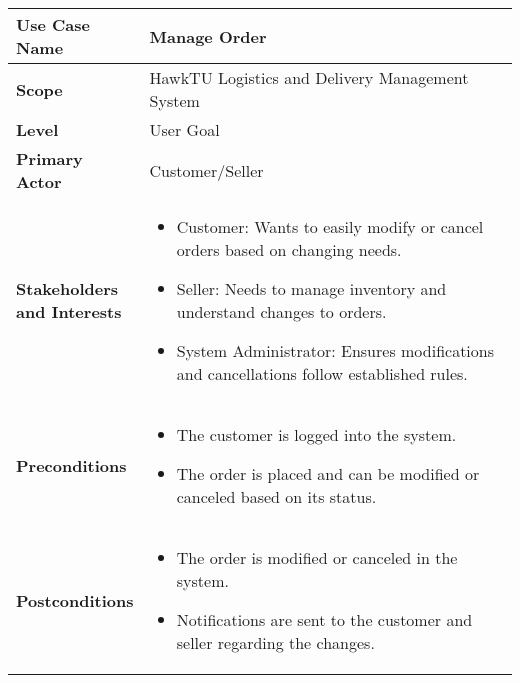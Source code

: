 \documentclass{article}
\begin{document}
\begin{longtable}{|>{\raggedright\arraybackslash}m{0.25\linewidth}|m{0.75\linewidth}|}
\hline
\textbf{Use Case Name} & Manage Order \\
\hline
\textbf{Scope} & HawkTU Logistics and Delivery Management System \\
\hline
\textbf{Level} & User Goal \\
\hline
\textbf{Primary Actor} & Customer/Seller \\
\hline
\textbf{Stakeholders and Interests} & 
\begin{itemize}
    \item Customer: Wants to easily modify or cancel orders based on changing needs.
    \item Seller: Needs to manage inventory and understand changes to orders.
    \item System Administrator: Ensures modifications and cancellations follow established rules.
\end{itemize} \\
\hline
\textbf{Preconditions} & 
\begin{itemize}
    \item The customer is logged into the system.
    \item The order is placed and can be modified or canceled based on its status.
\end{itemize} \\
\hline
\textbf{Postconditions} & 
\begin{itemize}
    \item The order is modified or canceled in the system.
    \item Notifications are sent to the customer and seller regarding the changes.
\end{itemize} \\
\hline
\end{longtable}

\vspace{-2.45em}
\end{document}
